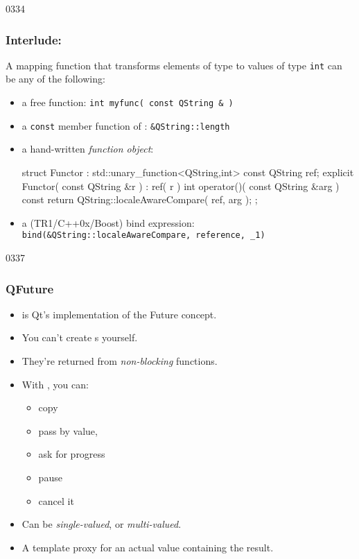 \begin{slide}[fragile]{0334}
\frametitle{Interlude: }
  A mapping function that transforms elements of type  to
  values of type \texttt{int} can be any of the following:
  \begin{itemize}
  \item a free function:
    \texttt{int myfunc( const QString \& )}
  \item a \texttt{const} member function of :
    \texttt{\&QString::length}
  \item a hand-written \emph{function object}:
    \begin{cpp}
struct Functor : std::unary_function<QString,int> {
  const QString ref;
  explicit Functor( const QString &r ) : ref( r ) {}
  int operator()( const QString &arg ) const {
    return QString::localeAwareCompare( ref, arg );
  }
};\end{cpp}
  \item a (TR1/C++0x/Boost) bind expression:\\
    \texttt{bind(\&QString::localeAwareCompare, reference, \_1)}
  \end{itemize}
\end{slide}


\begin{slide}{0337}
\frametitle{QFuture}\label{QFuture}
  \begin{itemize}
  \item {} is Qt's implementation of the Future concept.
  \item You can't create s yourself.
  \item They're returned from \emph{non-blocking}  functions.
  \item With , you can:
      \begin{itemize}
      \item copy
      \item pass by value,
      \item ask for progress
      \item pause
      \item cancel it
      \end{itemize}
  \item Can be \emph{single-valued}, or \emph{multi-valued}.
  \item A template proxy for an actual value containing the result.
  \end{itemize}
\end{slide}

